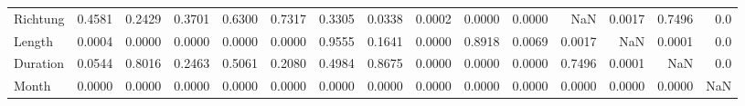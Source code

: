 \begin{tabular}{lrrrrrrrrrrrrrr}
Richtung      &     0.4581 &     0.2429 &    0.3701 &    0.6300 &    0.7317 &       0.3305 &       0.0338 &   0.0002 &         0.0000 &  0.0000 &       NaN &  0.0017 &    0.7496 &    0.0 \\
Length        &     0.0004 &     0.0000 &    0.0000 &    0.0000 &    0.0000 &       0.9555 &       0.1641 &   0.0000 &         0.8918 &  0.0069 &    0.0017 &     NaN &    0.0001 &    0.0 \\
Duration      &     0.0544 &     0.8016 &    0.2463 &    0.5061 &    0.2080 &       0.4984 &       0.8675 &   0.0000 &         0.0000 &  0.0000 &    0.7496 &  0.0001 &       NaN &    0.0 \\
Month         &     0.0000 &     0.0000 &    0.0000 &    0.0000 &    0.0000 &       0.0000 &       0.0000 &   0.0000 &         0.0000 &  0.0000 &    0.0000 &  0.0000 &    0.0000 &    NaN \\
\bottomrule
\end{tabular}
